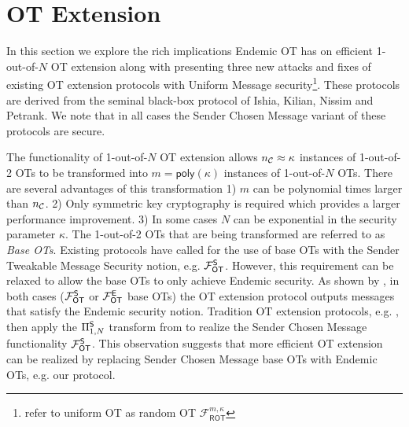 


\section{OT Extension} \label{sec:otext}


In this section we explore the rich implications Endemic OT has on efficient 1-out-of-$N$ OT extension along with presenting three new attacks and fixes of existing OT extension protocols\cite{C:KelOrsSch15, RSA:OrrOrsSch17} with Uniform Message security\footnote{\cite{C:KelOrsSch15, RSA:OrrOrsSch17} refer to uniform OT as random OT $\mathcal{F}^{m,\kappa}_{\textsf{ROT}}$}. These protocols are derived from the seminal black-box protocol of Ishia, Kilian, Nissim and Petrank\cite{C:IKNP03}. We note that in all cases the Sender Chosen Message variant of these protocols\cite{C:IKNP03, C:KelOrsSch15, RSA:OrrOrsSch17} are secure. %



The functionality of 1-out-of-$N$ OT extension allows ${n_\mathcal{C}}\approx\kappa$ instances of 1-out-of-2 OTs to be transformed into $m=\textsf{poly}(\kappa)$ instances of 1-out-of-$N$ OTs. There are several advantages of this transformation 1) $m$ can be polynomial times larger than ${n_\mathcal{C}}$. 2) Only symmetric key cryptography is required which provides a larger performance improvement. 3) In some cases $N$ can be exponential in the security parameter $\kappa$. The 1-out-of-2 OTs that are being transformed are referred to as \emph{Base OTs}. Existing protocols\cite{C:IKNP03,EC:ALSZ15, C:KelOrsSch15, RSA:OrrOrsSch17} have called for the use of base OTs with the Sender Tweakable Message Security notion, e.g. $\mathcal{F}_{\mathsf{OT}}^\mathsf{S}$. However, this requirement can be relaxed to allow the base OTs to only achieve Endemic security. As shown by , in both cases ($\mathcal{F}_{\mathsf{OT}}^\mathsf{S}$ or $\mathcal{F}_{\mathsf{OT}}^\mathsf{E}$ base OTs) the OT extension protocol outputs messages that satisfy the Endemic security notion.  Tradition OT extension protocols, e.g. \cite{C:IKNP03,EC:ALSZ15, C:KelOrsSch15}, then apply the $\Pi^{\mathsf{S}}_{1,N}$ transform from  to realize the Sender Chosen Message functionality $\mathcal{F}_{\mathsf{OT}}^\mathsf{S}$. This observation suggests that more efficient OT extension can be realized by replacing Sender Chosen Message base OTs with Endemic OTs, e.g. our protocol.

